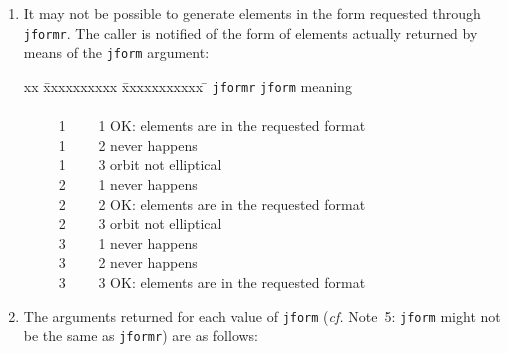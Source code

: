 \documentclass[11pt,fleqn,twoside]{article}
\renewcommand{\_}{{\tt\char'137}}     %
\begin{document}
{\begin{enumerate}
        ${\tt jform}=3$, suitable for comets:
 
        \begin{tabbing}
        xxx \= xxxxxxxx \= xx \= \kill
        \> {\tt epoch}  \> = \> epoch of perihelion $T$ (TDB MJD) \\
        \> {\tt orbinc} \> = \> inclination $i$ (radians) \\
        \> {\tt anode}  \> = \> longitude of the ascending node $\Omega$ (radians) \\
        \> {\tt perih}  \> = \> argument of perihelion $\omega$ (radians) \\
        \> {\tt aorq}   \> = \> perihelion distance $q$ (AU) \\
        \> {\tt e}   \> = \> eccentricity $e$ $( 0 \leq e \leq 10 )$
        \end{tabbing}
  \item It may not be possible to generate elements in the form
        requested through {\tt jformr}.  The caller is notified of the form
        of elements actually returned by means of the {\tt jform} argument:
 
        \begin{tabbing}
        xx \= xxxxxxxxxx \= xxxxxxxxxxx \= \kill
        \> {\tt jformr} \> {\tt jform} \> meaning \\ \\
        \> ~~~~~1   \> ~~~~1  \> OK: elements are in the requested format \\
        \> ~~~~~1   \> ~~~~2  \> never happens \\
        \> ~~~~~1   \> ~~~~3  \> orbit not elliptical \\
        \> ~~~~~2   \> ~~~~1  \> never happens \\
        \> ~~~~~2   \> ~~~~2  \> OK: elements are in the requested format \\
        \> ~~~~~2   \> ~~~~3  \> orbit not elliptical \\
        \> ~~~~~3   \> ~~~~1  \> never happens \\
        \> ~~~~~3   \> ~~~~2  \> never happens \\
        \> ~~~~~3   \> ~~~~3  \> OK: elements are in the requested format
        \end{tabbing}
  \item The arguments returned for each value of {\tt jform}
        ({\it cf.}\/ Note~5:
        {\tt jform} might not be the same as {\tt jformr}) are as follows:
 

\end{enumerate}}
\end{document}
